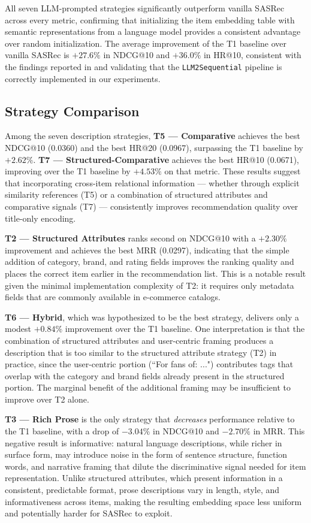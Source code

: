 \documentclass[12pt,a4paper]{report}
\begin{document}
All seven LLM-prompted strategies significantly outperform vanilla SASRec
across every metric, confirming that initializing the item embedding table with
semantic representations from a language model provides a consistent advantage
over random initialization. The average improvement of the T1 baseline over
vanilla SASRec is $+27.6\%$ in NDCG@10 and $+36.0\%$ in HR@10, consistent
with the findings reported in \citet{boz2025} and validating that the
\texttt{LLM2Sequential} pipeline is correctly implemented in our experiments.

\subsection*{Strategy Comparison}

Among the seven description strategies, \textbf{T5 — Comparative} achieves the
best NDCG@10 (0.0360) and the best HR@20 (0.0967), surpassing the T1 baseline
by $+2.62\%$. \textbf{T7 — Structured-Comparative} achieves the best HR@10
(0.0671), improving over the T1 baseline by $+4.53\%$ on that metric. These
results suggest that incorporating cross-item relational information — whether
through explicit similarity references (T5) or a combination of structured
attributes and comparative signals (T7) — consistently improves recommendation
quality over title-only encoding.

\textbf{T2 — Structured Attributes} ranks second on NDCG@10 with a $+2.30\%$
improvement and achieves the best MRR (0.0297), indicating that the simple
addition of category, brand, and rating fields improves the ranking quality and
places the correct item earlier in the recommendation list. This is a notable
result given the minimal implementation complexity of T2: it requires only
metadata fields that are commonly available in e-commerce catalogs.

\textbf{T6 — Hybrid}, which was hypothesized to be the best strategy, delivers
only a modest $+0.84\%$ improvement over the T1 baseline. One interpretation is
that the combination of structured attributes and user-centric framing produces
a description that is too similar to the structured attribute strategy (T2) in
practice, since the user-centric portion (``For fans of: ...") contributes tags
that overlap with the category and brand fields already present in the
structured portion. The marginal benefit of the additional framing may be
insufficient to improve over T2 alone.

\textbf{T3 — Rich Prose} is the only strategy that \emph{decreases} performance
relative to the T1 baseline, with a drop of $-3.04\%$ in NDCG@10 and $-2.70\%$
in MRR. This negative result is informative: natural language descriptions,
while richer in surface form, may introduce noise in the form of sentence
structure, function words, and narrative framing that dilute the discriminative
signal needed for item representation. Unlike structured attributes, which
present information in a consistent, predictable format, prose descriptions
vary in length, style, and informativeness across items, making the resulting
embedding space less uniform and potentially harder for SASRec to exploit.
\end{document}

